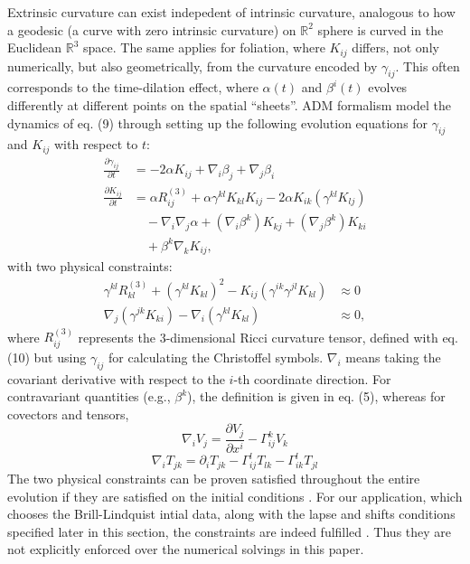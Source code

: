 \documentclass[conference]{IEEEtran}
\begin{document}
Extrinsic curvature can exist indepedent of intrinsic curvature, analogous to 
how a geodesic (a curve with zero intrinsic curvature) on $\mathbb{R}^2$ sphere is 
curved in the Euclidean $\mathbb{R}^3$ space. The same applies for foliation, where $K_{ij}$ 
differs, not only numerically, but also geometrically, from the curvature encoded by $\gamma_{ij}$. 
This often corresponds to the time-dilation effect, where $\alpha(t)$ and $\beta^i(t)$ evolves 
differently at different points on the spatial ``sheets''. ADM formalism model the dynamics of eq. 
(9) through setting up the following evolution equations for $\gamma_{ij}$ and $K_{ij}$ with respect to $t$:
\begin{align*}
\frac{\partial \gamma_{ij}}{\partial t} &= -2\alpha K_{ij} + \nabla_i\beta_j + \nabla_j\beta_i \\ 
\frac{\partial K_{ij}}{\partial t} 
&= \alpha R^{(3)}_{ij} + \alpha \gamma^{kl}K_{kl}K_{ij} 
   - 2\alpha K_{ik}(\gamma^{kl}K_{lj}) \\
&\quad  - \nabla_i \nabla_j \alpha + (\nabla_i \beta^k)K_{kj} + (\nabla_j \beta^k)K_{ki} \\
&\quad   + \beta^k \nabla_k K_{ij},
\end{align*}
with two physical constraints:
\begin{align*}
\gamma^{kl}R^{(3)}_{kl} + (\gamma^{kl}K_{kl})^2 - K_{ij}(\gamma^{ik}\gamma^{jl}K_{kl}) &\approx 0 \\
\nabla_j(\gamma^{jk}K_{ki}) - \nabla_i(\gamma^{kl}K_{kl}) &\approx 0,
\end{align*}
where $R^{(3)}_{ij}$ represents the 3-dimensional Ricci curvature tensor, defined with eq. (10) but using 
$\gamma_{ij}$ for calculating the Christoffel symbols. $\nabla_i$ means taking the covariant 
derivative with respect to the $i$-th coordinate direction. For contravariant quantities (e.g., $\beta^k$),
the definition is given in eq. (5), whereas for covectors and tensors, 
\[
\nabla_{i} V_{j} = \frac{\partial V_{j}}{\partial x^i}  - \Gamma^{k}_{ij} V_{k}
\]
\[
\nabla_i T_{jk} = \partial_i T_{jk} - \Gamma^l_{ij} T_{lk} - \Gamma^l_{ik} T_{jl}
\]
The two physical constraints can be proven satisfied throughout the entire evolution 
if they are satisfied on the initial conditions \cite{ADMCS}. For our application, which chooses the 
Brill-Lindquist intial data, along with the lapse and shifts conditions specified later in this 
section, the constraints are indeed fulfilled \cite{BLID}. Thus they are not explicitly enforced 
over the numerical solvings in this paper. 
\end{document}
